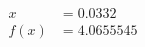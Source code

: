 \documentclass[preview]{standalone}
\begin{document}
\begin{align*}
x &= 0.0332\\f(x) &= 4.0655545
\end{align*}
\end{document}
